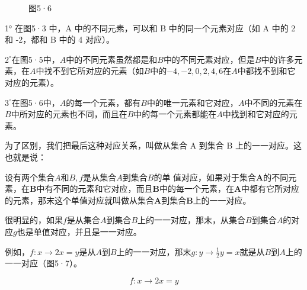 \begin{figure}
\centering
\caption{图5·6}
\end{figure}


1° 在图5·3 中，A 中的不同元素，可以和 B 中的同一个元素对应（如 A 中的 2
和 -2，都和 B 中的 4 对应）。

\(2^{\circ}\)在图5·5中，\(A\)中的不同元素虽然都是和\(B\)中的不同元素对应，但是\(B\)中的许多元素，在\(A\)中找不到它所对应的元素（如\(B\)中的\(-4, -2, 0, 2, 4, 6\)在\(A\)中都找不到和它对应的元素）。

\(3^{\circ}\)在图5·6中，\(A\)的每一个元素，都有\(B\)中的唯一元素和它对应，\(A\)中不同的元素在\(B\)中所对应的元素也不同，而且在\(B\)中的每一个元素都能在\(A\)中找到和它对应的元素。

为了区别，我们把最后这种对应关系，叫做从集合 A 到集合 B
上的一一对应。这也就是说：

设有两个集合\(A\)和\(B, f\)是从集合\(A\)到集合\(B\)的单
值对应，如果对于集合\(\pmb{A}\)的不同元素，在\(\pmb{B}\)中有不同的元素和它对应，而且\(\pmb{B}\)中的每一个元素，在\(\pmb{A}\)中都有它所对应的元素，那末这个单值对应就叫做从集合\(\pmb{A}\)到集合\(\pmb{B}\)上的一一对应。

很明显的，如果\(f\)是从集合\(A\)到集合\(B\)上的一一对应，那末，从集合\(B\)到集合\(A\)的对应\(g\)也是单值对应，并且是一一对应。

例如，\(f: x \to 2x = y\)是从\(A\)到\(B\)上的一一对应，那末\(g: y \to \frac{1}{2} y = x\)就是从\(B\)到\(A\)上的一一对应（图5·7）。

\[
f: x \rightarrow 2 x = y
\]

